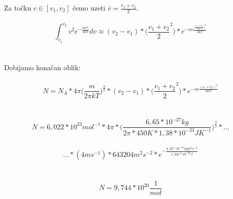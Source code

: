 \documentclass[a4paper,12pt]{article}
\begin{document}
\newpage
Za to\v{c}ku $c \in [v_1,v_2]$ \'cemo uzeti $\overline{v}=\frac{v_1+v_2}{2}$.
\\
\\
$$ \int_{v_1}^{v_2} v^2e^{-\frac{mv^2}{2kT}}dv \approx (v_2-v_1) * \Big( \frac{v_1+v_2}{2}^2 \Big) * e^{-m\frac{\big(\frac{v_1+v_2}{2}\big)^2}{2kT}} $$
\\
\\
Dobijamo kona\v{c}an oblik:
\\
\\
$$ N=N_A*4\pi \Big( \frac{m}{2\pi kT} \Big)^{\frac{3}{2}}* (v_2-v_1) * \Big( \frac{v_1+v_2}{2}^2 \Big) * e^{-m\frac{(v_1+v_2)^2}{8kT}} $$
\\
\\
$$ N=6,022*10^{23}mol^{-1}*4\pi*\Big( \frac{6,65*10^{-27}kg}{2\pi*450K*1,38*10^{-23}JK^{-1}} \Big)^{\frac{3}{2}}*...$$
\\
$$ ...*(4ms^{-1})*643204m^2s^{-2}*e^{-\frac{4,28*10^{-21}kgm^2s^{-2}}{1,245*10^{-20}J}} $$
\\
\\
$$ N=9,744*10^{20}\frac{1}{mol} $$
\end{document}
